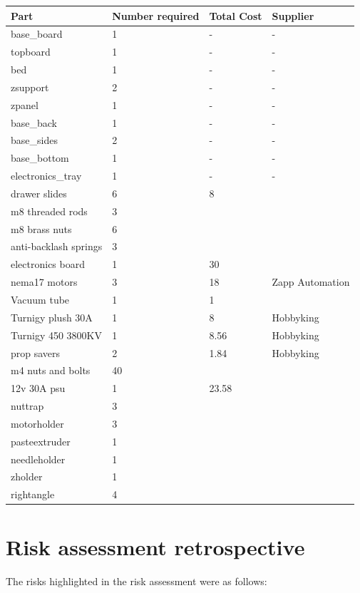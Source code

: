 \begin{tabular}{ | l | l | l | l | }
\hline
	Part & Number required & Total Cost & Supplier \\ \hline
	base\_board & 1 & - & - \\ \hline
	topboard & 1 & - & - \\ \hline
	bed & 1 & - & - \\ \hline
	zsupport & 2 & - & - \\ \hline
	zpanel & 1 & - & - \\ \hline
	base\_back & 1 & - & - \\ \hline
	base\_sides & 2 & - & - \\ \hline
	base\_bottom & 1 & - & - \\ \hline
	electronics\_tray & 1 & - & - \\ \hline
	drawer slides & 6 & 8 & \  \\ \hline
	m8 threaded rods & 3 & \  & \  \\ \hline
	m8 brass nuts & 6 & \  & \  \\ \hline
	anti-backlash springs & 3 & \  & \  \\ \hline
	electronics board & 1 & 30 & \  \\ \hline
	nema17 motors & 3 & 18 & Zapp Automation \\ \hline
	Vacuum tube & 1 & 1 & \  \\ \hline
	Turnigy plush 30A & 1 & 8 & Hobbyking \\ \hline
	Turnigy 450 3800KV & 1 & 8.56 & Hobbyking \\ \hline
	prop savers & 2 & 1.84 & Hobbyking \\ \hline
	m4 nuts and bolts & 40 & \  & \  \\ \hline
	12v 30A psu & 1 & 23.58 & \  \\ \hline
	nuttrap & 3 & \  & \  \\ \hline
	motorholder & 3 & \  & \  \\ \hline
	pasteextruder & 1 & \  & \  \\ \hline
	needleholder & 1 & \  & \  \\ \hline
	zholder & 1 & \  & \  \\ \hline
	rightangle & 4 & \  & \  \\ \hline
\end{tabular}


\newpage
\section{Risk assessment retrospective}
The risks highlighted in the risk assessment were as follows:

